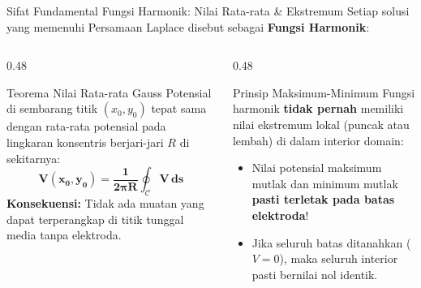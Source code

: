 \documentclass[aspectratio=169,10pt]{beamer}
\begin{document}
\begin{frame}{Sifat Fundamental Fungsi Harmonik: Nilai Rata-rata \& Ekstremum}
  Setiap solusi yang memenuhi Persamaan Laplace disebut sebagai \textbf{Fungsi Harmonik}:
  \vspace{0.1cm}
  \begin{columns}[t]
    \begin{column}{0.48\textwidth}
      \begin{block}{Teorema Nilai Rata-rata Gauss}
        \small
        Potensial di sembarang titik $(x_0, y_0)$ tepat sama dengan rata-rata potensial pada lingkaran konsentris berjari-jari $R$ di sekitarnya:
        \begin{equation*}
          \mathbf{V(x_0, y_0) = \frac{1}{2\pi R} \oint_{\mathcal{C}} V \, ds}
        \end{equation*}
        \textbf{Konsekuensi:} Tidak ada muatan yang dapat terperangkap di titik tunggal media tanpa elektroda.
      \end{block}
    \end{column}
    \begin{column}{0.48\textwidth}
      \begin{alertblock}{Prinsip Maksimum-Minimum}
        \small
        Fungsi harmonik \textbf{tidak pernah} memiliki nilai ekstremum lokal (puncak atau lembah) di dalam interior domain:
        \begin{itemize}
          \item Nilai potensial maksimum mutlak dan minimum mutlak \textbf{pasti terletak pada batas elektroda}!
          \item Jika seluruh batas ditanahkan ($V = 0$), maka seluruh interior pasti bernilai nol identik.
        \end{itemize}
      \end{alertblock}
    \end{column}
  \end{columns}
\end{frame}
\end{document}
